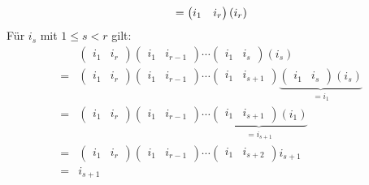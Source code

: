 \begin{subproof*}
\begin{description}
\[				= \begin{pmatrix} i_1 & i_r \end{pmatrix} (i_r)\\
			\]
			Für $ i_s $ mit $ 1 \leq  s < r $ gilt:
			\begin{align*}
				&\begin{pmatrix} i_1 & i_r \end{pmatrix} \begin{pmatrix} i_1 & i_{r - 1}  \end{pmatrix} \dotsb \begin{pmatrix} i_1 & i_s \end{pmatrix} (i_s)\\
				=& \begin{pmatrix} i_1 & i_r \end{pmatrix} \begin{pmatrix} i_1 & i_{r - 1}  \end{pmatrix} \dotsb \begin{pmatrix} i_1 & i_{s+1}  \end{pmatrix} \underbrace{\begin{pmatrix} i_1 & i_s \end{pmatrix} (i_s)}_{= i_1}\\
				=& \begin{pmatrix} i_1 & i_r \end{pmatrix} \begin{pmatrix} i_1 & i_{r - 1}  \end{pmatrix} \dotsb \underbrace{\begin{pmatrix} i_1 & i_{s + 1}  \end{pmatrix} (i_1)}_{=i_{s + 1} }\\
				=& \begin{pmatrix} i_1 & i_r \end{pmatrix} \begin{pmatrix} i_1 & i_{r - 1}  \end{pmatrix} \dotsb \begin{pmatrix} i_1 & i_{s + 2}  \end{pmatrix} i_{s + 1} \\
				=& i_{s + 1} 
			\end{align*}
	\end{description}
\end{subproof*}

